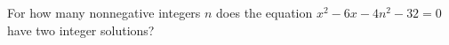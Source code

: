 For how many nonnegative integers $n$ does the equation $x^2-6x-4n^2-32=0$ have two integer solutions?
